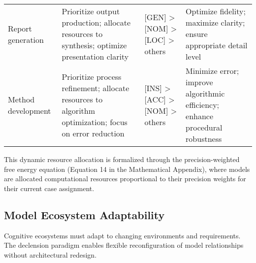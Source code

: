 \begin{longtable}[]{@{}llll@{}}
\begin{minipage}[t]{0.13\columnwidth}\raggedright
Report generation\strut
\end{minipage} & \begin{minipage}[t]{0.24\columnwidth}\raggedright
Prioritize output production; allocate resources to synthesis; optimize
presentation clarity\strut
\end{minipage} & \begin{minipage}[t]{0.19\columnwidth}\raggedright
{[}GEN{]} \textgreater{} {[}NOM{]} \textgreater{} {[}LOC{]}
\textgreater{} others\strut
\end{minipage} & \begin{minipage}[t]{0.32\columnwidth}\raggedright
Optimize fidelity; maximize clarity; ensure appropriate detail
level\strut
\end{minipage}\tabularnewline
\begin{minipage}[t]{0.13\columnwidth}\raggedright
Method development\strut
\end{minipage} & \begin{minipage}[t]{0.24\columnwidth}\raggedright
Prioritize process refinement; allocate resources to algorithm
optimization; focus on error reduction\strut
\end{minipage} & \begin{minipage}[t]{0.19\columnwidth}\raggedright
{[}INS{]} \textgreater{} {[}ACC{]} \textgreater{} {[}NOM{]}
\textgreater{} others\strut
\end{minipage} & \begin{minipage}[t]{0.32\columnwidth}\raggedright
Minimize error; improve algorithmic efficiency; enhance procedural
robustness\strut
\end{minipage}\tabularnewline
\bottomrule
\end{longtable}

This dynamic resource allocation is formalized through the
precision-weighted free energy equation (Equation 14 in the Mathematical
Appendix), where models are allocated computational resources
proportional to their precision weights for their current case
assignment.

\hypertarget{model-ecosystem-adaptability}{%
\subsection{Model Ecosystem
Adaptability}\label{model-ecosystem-adaptability}}

Cognitive ecosystems must adapt to changing environments and
requirements. The declension paradigm enables flexible reconfiguration
of model relationships without architectural redesign.

